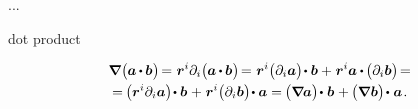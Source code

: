...

 dot product 

\nopagebreak\vspace{-0.4em}\begin{multline}\label{gradientofdotproductoftwovectors}
\boldnabla \hspace{.1ex} \bigl( \hspace{-0.05ex} \bm{a} \hspace{-0.1ex} \dotp \hspace{-0.1ex} \bm{b} \hspace{.05ex} \bigr) \hspace{-0.3ex}
= \hspace{.1ex} \locationvector^i \partial_i \bigl( \hspace{-0.05ex} \bm{a} \hspace{-0.1ex} \dotp \hspace{-0.1ex} \bm{b} \hspace{.05ex} \bigr) \hspace{-0.33ex}
= \hspace{.1ex} \locationvector^i \bigl( \partial_i \bm{a} \bigr) \hspace{-0.32ex} \dotp \bm{b} + \hspace{.1ex} \locationvector^i \bm{a} \hspace{-0.05ex} \dotp \hspace{-0.15ex} \bigl( \partial_i \bm{b} \bigr) \hspace{-0.33ex} =
\\[-0.1em]
%
= \hspace{-0.2ex} \bigl( \locationvector^i \partial_i \bm{a} \bigr) \hspace{-0.32ex} \dotp \bm{b} \hspace{.1ex} + \hspace{.1ex} \locationvector^i \bigl( \partial_i \bm{b} \bigr) \hspace{-0.33ex} \dotp \bm{a}
= \hspace{-0.16ex} \bigl( \boldnabla \hspace{-0.1ex} \bm{a} \bigr) \hspace{-0.3ex} \dotp \hspace{.1ex} \bm{b} \hspace{.1ex} + \hspace{-0.1ex} \bigl( \boldnabla \hspace{.1ex} \bm{b} \bigr) \hspace{-0.27ex} \dotp \hspace{.1ex} \bm{a}
\hspace{.2ex} .
\end{multline}
